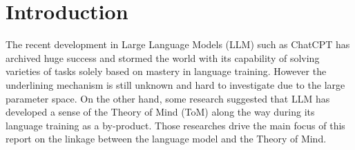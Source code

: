 \documentclass[12pt]{article}
\begin{document}


\newpage
\tableofcontents



\newpage
\section{Introduction}

The recent development in Large Language Models (LLM) such as ChatCPT has archived huge success and stormed the world  with its capability of solving varieties of tasks solely based on mastery in language training\cite{cite:1}. However the underlining mechanism is still unknown and hard to investigate due to the large parameter space. On the other hand, some research\cite{cite:2} suggested that LLM has developed a sense of the Theory of Mind (ToM) along the way during its language training as a by-product. Those researches drive the main focus of this report on the linkage between the language model and the Theory of Mind.
\end{document}

